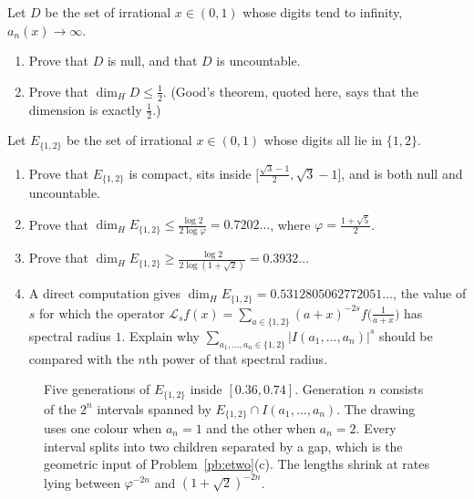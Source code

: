 \begin{exercise}[$\star\star$]\label{pb:good}
Let $D$ be the set of irrational $x\in(0,1)$ whose digits tend to infinity, $a_n(x)\to\infty$.
\begin{enumerate}[label=(\alph*)]
\item Prove that $D$ is null, and that $D$ is uncountable.
\item Prove that $\dim_HD\le\frac12$. (Good's theorem, quoted here, says that the dimension is exactly $\frac12$.)
\end{enumerate}
\end{exercise}

\begin{exercise}[$\star\star\star$]\label{pb:etwo}
Let $E_{\{1,2\}}$ be the set of irrational $x\in(0,1)$ whose digits all lie in $\{1,2\}$.
\begin{enumerate}[label=(\alph*)]
\item Prove that $E_{\{1,2\}}$ is compact, sits inside $\bigl[\frac{\sqrt3-1}2,\sqrt3-1\bigr]$, and is both null and uncountable.
\item Prove that $\dim_HE_{\{1,2\}}\le\frac{\log2}{2\log\varphi}=0.7202\ldots$, where $\varphi=\frac{1+\sqrt5}2$.
\item Prove that $\dim_HE_{\{1,2\}}\ge\frac{\log2}{2\log(1+\sqrt2)}=0.3932\ldots$
\item A direct computation gives $\dim_HE_{\{1,2\}}=0.5312805062772051\ldots$, the value of $s$ for which the operator $\mathcal L_sf(x)=\sum_{a\in\{1,2\}}(a+x)^{-2s}f\bigl(\frac1{a+x}\bigr)$ has spectral radius $1$. Explain why $\sum_{a_1,\dots,a_n\in\{1,2\}}|I(a_1,\dots,a_n)|^s$ should be compared with the $n$th power of that spectral radius.
\end{enumerate}
\end{exercise}

\begin{figure}[ht]
\centering
{}
\caption{Five generations of $E_{\{1,2\}}$ inside $[0.36,0.74]$. Generation $n$ consists of the $2^n$ intervals spanned by $E_{\{1,2\}}\cap I(a_1,\dots,a_n)$. The drawing uses one colour when $a_n=1$ and the other when $a_n=2$. Every interval splits into two children separated by a gap, which is the geometric input of Problem~\ref{pb:etwo}(c). The lengths shrink at rates lying between $\varphi^{-2n}$ and $(1+\sqrt2)^{-2n}$.}\label{fig:etwo}
\end{figure}

